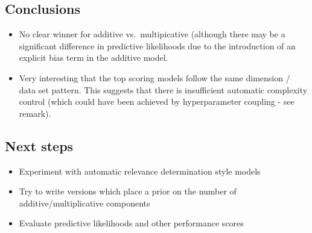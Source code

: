 \documentclass[twoside,11pt]{article}
\begin{document}
\subsection{Conclusions}

\begin{itemize}
\item No clear winner for additive vs.~multipicative (although there may be a significant difference in predictive likelihoods due to the introduction of an explicit bias term in the additive model.
\item Very interesting that the top scoring models follow the same dimension / data set pattern. This suggests that there is insufficient automatic complexity control (which could have been achieved by hyperparameter coupling - see remark).
\end{itemize}

\subsection{Next steps}

\begin{itemize}
\item Experiment with automatic relevance determination style models
\item Try to write versions which place a prior on the number of additive/multiplicative components
\item Evaluate predictive likelihoods and other performance scores
\end{itemize}

\newpage


\vskip 0.2in

\end{document}
